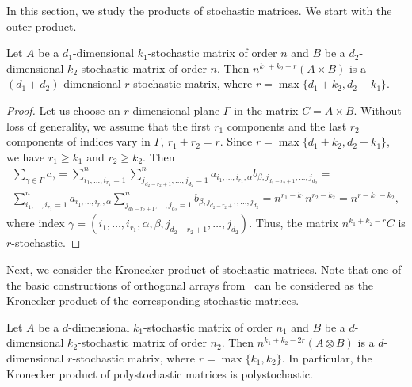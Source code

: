 \documentclass[a4paper]{article}
\begin{document}
In this section, we study the products of stochastic matrices. We start with the outer product.

\begin{teorema} \label{outerstoch}
Let $A$ be a $d_1$-dimensional $k_1$-stochastic matrix of order $n$ and $B$  be a $d_2$-dimensional $k_2$-stochastic matrix of order $n$. Then $n^{ k_1 + k_2 -r}  (A \times B)$ is a $(d_1 + d_2)$-dimensional $r$-stochastic matrix, where $r = \max \{ d_1 + k_2, d_2 + k_1\}$. 
\end{teorema}  

\begin{proof}
Let us choose an $r$-dimensional plane $\Gamma$ in the matrix $C = A \times B$. Without loss of generality, we assume that the first $r_1$ components and the last $r_2$ components of indices vary in $\Gamma$, $r_1 + r_2 = r$. Since $r  = \max \{ d_1 + k_2, d_2 + k_1\}$, we have  $r_1 \geq k_1$ and $r_2 \geq k_2$. Then 
\begin{gather*}
\sum \limits_{\gamma \in \Gamma} c_\gamma = \sum\limits_{i_1, \ldots ,i_{r_1} = 1}^n \sum\limits_{j_{d_2 - r_2 +1}, \ldots, j_{d_2} =1}^n  a_{i_1, \ldots ,i_{r_1}, \alpha} b_{\beta, j_{d_2 - r_2 +1}, \ldots, j_{d_2}}  = \\
 \sum\limits_{i_1, \ldots ,i_{r_1} = 1}^n  a_{i_1, \ldots ,i_{r_1}, \alpha}  \sum\limits_{j_{d_2 - r_2 +1}, \ldots, j_{d_2} =1}^n b_{\beta, j_{d_2 - r_2 +1}, \ldots, j_{d_2}}  = n^{r_1 - k_1} n^{r_2 - k_2} = n^{r - k_1 -k_2},
 \end{gather*}
 where index $\gamma = (i_1, \ldots, i_{r_1}, \alpha, \beta, j_{d_2 - r_2 +1}, \ldots, j_{d_2})$.
Thus, the matrix $n^{ k_1 + k_2 -r}C$ is  $r$-stochastic.
\end{proof}


Next, we consider the Kronecker product of stochastic matrices. Note that one of the basic constructions of orthogonal arrays from~\cite{MacHar.eulersq} can be considered as the Kronecker product of the corresponding stochastic matrices.

\begin{teorema}
Let $A$ be a $d$-dimensional $k_1$-stochastic matrix of order $n_1$ and $B$  be a $d$-dimensional $k_2$-stochastic matrix of order $n_2$. Then $n^{k_1 + k_2 - 2r} (A \otimes B)$ is a $d$-dimensional $r$-stochastic matrix, where  $r = \max \{ k_1, k_2\}$.  In particular, the Kronecker product of polystochastic matrices is polystochastic.
\end{teorema}
\end{document}
